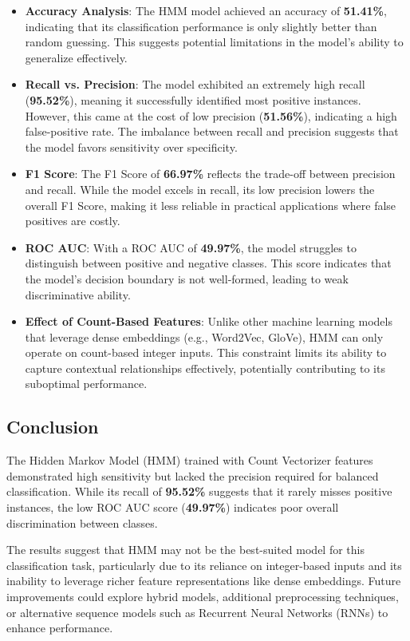 \begin{itemize}
    \item \textbf{Accuracy Analysis}: The HMM model achieved an accuracy of \textbf{51.41\%}, indicating that its classification performance is only slightly better than random guessing. This suggests potential limitations in the model's ability to generalize effectively.
    
    \item \textbf{Recall vs. Precision}: The model exhibited an extremely high recall (\textbf{95.52\%}), meaning it successfully identified most positive instances. However, this came at the cost of low precision (\textbf{51.56\%}), indicating a high false-positive rate. The imbalance between recall and precision suggests that the model favors sensitivity over specificity.
    
    \item \textbf{F1 Score}: The F1 Score of \textbf{66.97\%} reflects the trade-off between precision and recall. While the model excels in recall, its low precision lowers the overall F1 Score, making it less reliable in practical applications where false positives are costly.
    
    \item \textbf{ROC AUC}: With a ROC AUC of \textbf{49.97\%}, the model struggles to distinguish between positive and negative classes. This score indicates that the model's decision boundary is not well-formed, leading to weak discriminative ability.
    
    \item \textbf{Effect of Count-Based Features}: Unlike other machine learning models that leverage dense embeddings (e.g., Word2Vec, GloVe), HMM can only operate on count-based integer inputs. This constraint limits its ability to capture contextual relationships effectively, potentially contributing to its suboptimal performance.
\end{itemize}

\subsection{Conclusion}

The Hidden Markov Model (HMM) trained with Count Vectorizer features demonstrated high sensitivity but lacked the precision required for balanced classification. While its recall of \textbf{95.52\%} suggests that it rarely misses positive instances, the low ROC AUC score (\textbf{49.97\%}) indicates poor overall discrimination between classes. 

The results suggest that HMM may not be the best-suited model for this classification task, particularly due to its reliance on integer-based inputs and its inability to leverage richer feature representations like dense embeddings. Future improvements could explore hybrid models, additional preprocessing techniques, or alternative sequence models such as Recurrent Neural Networks (RNNs) to enhance performance.

